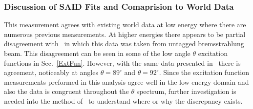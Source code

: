 \subsubsection{Discussion of SAID Fits and Comaprision to World Data}\label{sec:discussion}
This measurement agrees with existing world data at low energy where there are numerous previous measurements. At higher energies there appears to be partial disagreement with~\cite{brem} in which this data was taken from untagged bremsstrahlung beam. This disagreement can be seen in some of the low angle $\theta$ excitation functions in Sec.~\ref{ExtFun}. However, with the same data presented in~\cite{brem} there is agreement, noticeably at angles $\theta = 89^\circ$ and $\theta = 92^\circ$. Since the excitation function measurements preformed in this analysis agree well in the low energy domain and also the data is congruent throughout the $\theta$ spectrum, further investigation is needed into the method of~\cite{brem} to understand where or why the discrepancy exists.
%
%
\FloatBarrier

